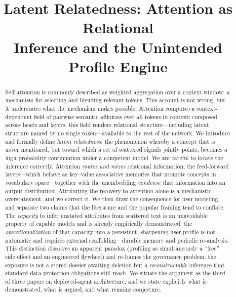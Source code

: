 \documentclass[conference]{IEEEtran}
\theoremstyle{definition}
\begin{document}
\title{Latent Relatedness: Attention as Relational\\ Inference and the Unintended Profile Engine}

\author{
}

\maketitle

\begin{abstract}
Self-attention is commonly described as weighted aggregation over a context window: a mechanism for selecting and blending relevant tokens. This account is not wrong, but it understates what the mechanism makes possible. Attention computes a context-dependent field of pairwise semantic affinities over all tokens in context; composed across heads and layers, this field renders relational structure---including latent structure named by no single token---available to the rest of the network. We introduce and formally define \emph{latent relatedness}: the phenomenon whereby a concept that is never mentioned, but toward which a set of scattered signals jointly points, becomes a high-probability continuation under a competent model. We are careful to locate the inference correctly. Attention \emph{routes and mixes} relational information; the feed-forward layers---which behave as key--value associative memories that promote concepts in vocabulary space---together with the unembedding \emph{condense} that information into an output distribution. Attributing the recovery to attention alone is a mechanistic overstatement, and we correct it. We then draw the consequence for user modeling, and separate two claims that the literature and the popular framing tend to conflate. The \emph{capacity} to infer unstated attributes from scattered text is an unavoidable property of capable models and is already empirically demonstrated; the \emph{operationalization} of that capacity into a persistent, sharpening user profile is not automatic and requires external scaffolding---durable memory and periodic re-analysis. This distinction dissolves an apparent paradox (profiling as simultaneously a ``free'' side effect and an engineered flywheel) and re-frames the governance problem: the exposure is not a stored dossier awaiting deletion but a \emph{reconstructable} inference that standard data-protection obligations still reach. We situate the argument as the third of three papers on deployed-agent architecture, and we state explicitly what is demonstrated, what is argued, and what remains conjecture.
\end{abstract}
\end{document}
